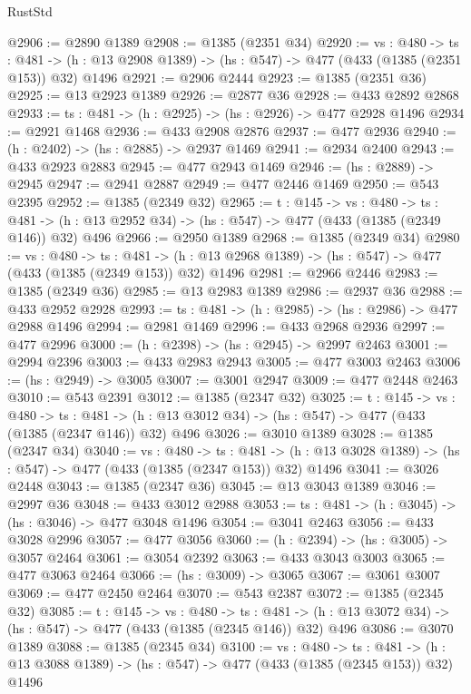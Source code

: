 \begin{lexlean}{RustStd}
\begin{coremodule}
{\begin{coremodule}
{{{{{{{@2906 := @2890 @1389
@2908 := @1385 (@2351 @34)
@2920 := {vs : @480} ->
  {ts : @481} -> (h : @13 @2908 @1389) -> (hs : @547) -> @477 (@433 (@1385 (@2351 @153)) @32) @1496
@2921 := @2906 @2444
@2923 := @1385 (@2351 @36)
@2925 := @13 @2923 @1389
@2926 := @2877 @36
@2928 := @433 @2892 @2868
@2933 := {ts : @481} -> (h : @2925) -> (hs : @2926) -> @477 @2928 @1496
@2934 := @2921 @1468
@2936 := @433 @2908 @2876
@2937 := @477 @2936
@2940 := (h : @2402) -> (hs : @2885) -> @2937 @1469
@2941 := @2934 @2400
@2943 := @433 @2923 @2883
@2945 := @477 @2943 @1469
@2946 := (hs : @2889) -> @2945
@2947 := @2941 @2887
@2949 := @477 @2446 @1469
@2950 := @543 @2395
@2952 := @1385 (@2349 @32)
@2965 := {t : @145} ->
  {vs : @480} ->
  {ts : @481} -> (h : @13 @2952 @34) -> (hs : @547) -> @477 (@433 (@1385 (@2349 @146)) @32) @496
@2966 := @2950 @1389
@2968 := @1385 (@2349 @34)
@2980 := {vs : @480} ->
  {ts : @481} -> (h : @13 @2968 @1389) -> (hs : @547) -> @477 (@433 (@1385 (@2349 @153)) @32) @1496
@2981 := @2966 @2446
@2983 := @1385 (@2349 @36)
@2985 := @13 @2983 @1389
@2986 := @2937 @36
@2988 := @433 @2952 @2928
@2993 := {ts : @481} -> (h : @2985) -> (hs : @2986) -> @477 @2988 @1496
@2994 := @2981 @1469
@2996 := @433 @2968 @2936
@2997 := @477 @2996
@3000 := (h : @2398) -> (hs : @2945) -> @2997 @2463
@3001 := @2994 @2396
@3003 := @433 @2983 @2943
@3005 := @477 @3003 @2463
@3006 := (hs : @2949) -> @3005
@3007 := @3001 @2947
@3009 := @477 @2448 @2463
@3010 := @543 @2391
@3012 := @1385 (@2347 @32)
@3025 := {t : @145} ->
  {vs : @480} ->
  {ts : @481} -> (h : @13 @3012 @34) -> (hs : @547) -> @477 (@433 (@1385 (@2347 @146)) @32) @496
@3026 := @3010 @1389
@3028 := @1385 (@2347 @34)
@3040 := {vs : @480} ->
  {ts : @481} -> (h : @13 @3028 @1389) -> (hs : @547) -> @477 (@433 (@1385 (@2347 @153)) @32) @1496
@3041 := @3026 @2448
@3043 := @1385 (@2347 @36)
@3045 := @13 @3043 @1389
@3046 := @2997 @36
@3048 := @433 @3012 @2988
@3053 := {ts : @481} -> (h : @3045) -> (hs : @3046) -> @477 @3048 @1496
@3054 := @3041 @2463
@3056 := @433 @3028 @2996
@3057 := @477 @3056
@3060 := (h : @2394) -> (hs : @3005) -> @3057 @2464
@3061 := @3054 @2392
@3063 := @433 @3043 @3003
@3065 := @477 @3063 @2464
@3066 := (hs : @3009) -> @3065
@3067 := @3061 @3007
@3069 := @477 @2450 @2464
@3070 := @543 @2387
@3072 := @1385 (@2345 @32)
@3085 := {t : @145} ->
  {vs : @480} ->
  {ts : @481} -> (h : @13 @3072 @34) -> (hs : @547) -> @477 (@433 (@1385 (@2345 @146)) @32) @496
@3086 := @3070 @1389
@3088 := @1385 (@2345 @34)
@3100 := {vs : @480} ->
  {ts : @481} -> (h : @13 @3088 @1389) -> (hs : @547) -> @477 (@433 (@1385 (@2345 @153)) @32) @1496
}}}}}}}
\end{coremodule}}
\end{coremodule}
\end{lexlean}
